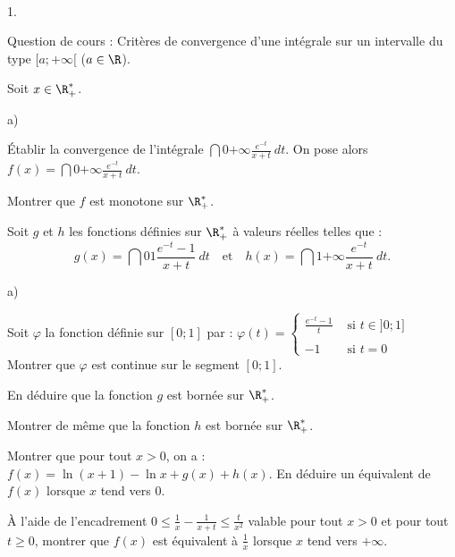 \documentclass[11pt]{article}%
\begin{document}
\begin{exerciceAP}~
  \begin{noliste}{1.}
    \setlength{\itemsep}{2mm}
  \item Question de cours : Critères de convergence d'une intégrale
    sur un intervalle du type $[a ; +\infty[$ ($a \in \R$).

  \item Soit $x \in \R_+^*$. 
    \begin{noliste}{a)}
    \setlength{\itemsep}{2mm}
    \item Établir la convergence de l'intégrale $\dint{0}{+\infty}
      \frac{ e^{ -t } }{ x + t } \ dt$. On pose alors $f(x) =
      \dint{0}{+\infty} \frac{ e^{ -t } }{ x + t } \ dt$.

    \item Montrer que $f$ est monotone sur $\R_+^*$.

    \end{noliste}

  \item Soit $g$ et $h$ les fonctions définies sur $\R_+^*$ à valeurs
    réelles telles que :
    \[
    g(x) = \dint{0}{1} \frac{ e^{ -t } - 1 }{ x + t } \ dt \ \ \
    \text{ et } \ \ \ h(x) = \dint{1}{+\infty} \frac{ e^{ -t } }{ x +
      t } \ dt .
    \]

    \begin{noliste}{a)}
      \setlength{\itemsep}{2mm}
    \item Soit $\varphi$ la fonction définie sur $[0;1]$ par :
      $\varphi (t) = \left\{
        \begin{array}{ll} 
          \frac{ e^{ -t } - 1 }{t} & \text{ si } t \in ] 0 ; 1] \\ 
          \\ 
          -1 & \text{ si } t = 0 
        \end{array} \right.$ \\
      Montrer que $\varphi$ est continue sur le segment $[0;1]$.

    \item En déduire que la fonction $g$ est bornée sur $\R_+^*$.

    \item Montrer de même que la fonction $h$ est bornée sur $\R_+^*$.

    \item Montrer que pour tout $x > 0$, on a : $f(x) = \ln (x+1) -
      \ln x + g(x) + h(x)$. En déduire un équivalent de $f(x)$ lorsque
      $x$ tend vers 0.

    \end{noliste}

  \item À l'aide de l'encadrement $0 \leq \frac{ 1 }{ x } - \frac{ 1
    }{ x + t } \leq \frac{ t }{ x^2 }$ valable pour tout $x > 0$ et
    pour tout $t \geq 0$, montrer que $f(x)$ est équivalent à $\frac{
      1 }{ x } $ lorsque $x$ tend vers $+\infty$.
  \end{noliste}
\end{exerciceAP}
\end{document}
